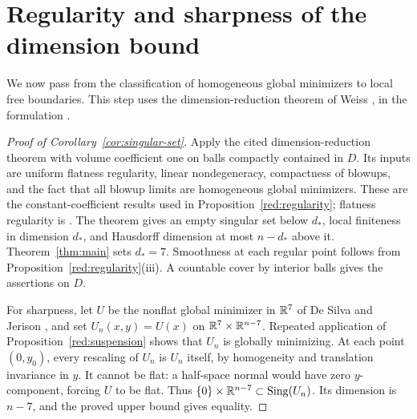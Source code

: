 \section{Regularity and sharpness of the dimension bound}
\label{sec:consequences}

We now pass from the classification of homogeneous global minimizers to
local free boundaries. This step uses the dimension-reduction theorem of
Weiss \cite{Weiss1999}, in the formulation
\cite[Theorem~1.4 and Proposition~10.13]{Velichkov2023}.

\begin{proof}[Proof of Corollary~\ref{cor:singular-set}]
Apply the cited dimension-reduction theorem with volume coefficient one
on balls compactly contained in $D$. Its inputs are uniform flatness
regularity, linear nondegeneracy, compactness of blowups, and the fact that
all blowup limits are homogeneous global minimizers. These are the
constant-coefficient results used in Proposition~\ref{red:regularity};
flatness regularity is \cite[Theorem~8.1]{Velichkov2023}.
The theorem gives an empty singular set below $d_*$, local finiteness in
dimension $d_*$, and Hausdorff dimension at most $n-d_*$ above it.
Theorem~\ref{thm:main} sets $d_*=7$. Smoothness at each regular point
follows from Proposition~\ref{red:regularity}(iii). A countable cover by
interior balls gives the assertions on $D$.

For sharpness, let $U$ be the nonflat global minimizer in $\mathbb R^7$ of
De Silva and Jerison \cite[Theorem~1.1]{DeSilvaJerison2009}, and set
$U_n(x,y)=U(x)$ on $\mathbb R^7\times\mathbb R^{n-7}$.
Repeated application of Proposition~\ref{red:suspension} shows that $U_n$
is globally minimizing. At each point $(0,y_0)$, every rescaling of $U_n$
is $U_n$ itself, by homogeneity and translation invariance in $y$.
It cannot be flat: a half-space normal would have zero $y$-component,
forcing $U$ to be flat. Thus
$\{0\}\times\mathbb R^{n-7}\subset\operatorname{Sing}(U_n)$.
Its dimension is $n-7$, and the proved upper bound gives equality.
\end{proof}
